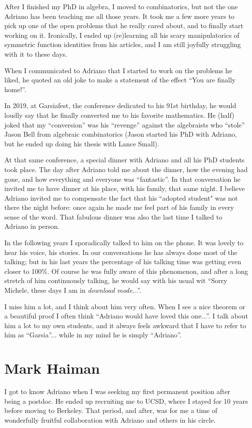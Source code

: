 \documentclass{amsart}
\begin{document}
After I finished my PhD in algebra, I moved to combinatorics, but not the one Adriano has been teaching me all those years. It took me a few more years to pick up one of the open problems that he really cared about, and to finally start working on it. Ironically, I ended up (re)learning all his scary manipulatorics of symmetric function identities from his articles, and I am still joyfully struggling with it to these days. 

When I communicated to Adriano that I started to work on the problems he liked, he quoted an old joke to make a statement of the effect ``You are finally home!''. 

In 2019, at Garsiafest, the conference dedicated to his 91st birthday, he would loudly say that he finally converted me to his favorite mathematics. He (half) joked that my ``conversion'' was his ``revenge'' against the algebraists who ``stole'' Jason Bell from algebraic combinatorics (Jason started his PhD with Adriano, but he ended up doing his thesis with Lance Small).

At that same conference, a special dinner with Adriano and all his PhD students took place. The day after Adriano told me about the dinner, how the evening had gone, and how everything and everyone was ``fantastic''. In that conversation he invited me to have dinner at his place, with his family, that same night. I believe Adriano invited me to compensate the fact that his ``adopted student" was not there the night before: once again he made me feel part of his family in every sense of the word. That fabulous dinner was also the last time I talked to Adriano in person.

In the following years I sporadically talked to him on the phone. It was lovely to hear his voice, his stories. In our conversations he has always done most of the talking; but in his last years the percentage of his talking time was getting even closer to 100\%. Of course he was fully aware of this phenomenon, and after a long stretch of him continuously talking, he would say with his usual wit ``Sorry Michele, these days I am in \textit{download mode}...''.

I miss him a lot, and I think about him very often. When I see a nice theorem or a beautiful proof I often think ``Adriano would have loved this one...''. I talk about him a lot to my own students, and it always feels awkward that I have to refer to him as ``Garsia''... while in my mind he is simply ``Adriano''. 

\section*{Mark Haiman}
I got to know Adriano when I was seeking my first permanent position after being a postdoc.  He ended up recruiting me to UCSD, where I stayed for 10 years before moving to Berkeley.  That period, and after, was for me a time of wonderfully fruitful collaboration with Adriano and others in his circle.
\end{document}
